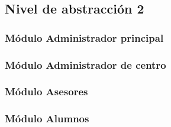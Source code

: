 \subsection{Nivel de abstracción 2}

\subsubsection{Módulo Administrador principal}



\subsubsection{Módulo Administrador de centro}



\subsubsection{Módulo Asesores}



\subsubsection{Módulo Alumnos}


